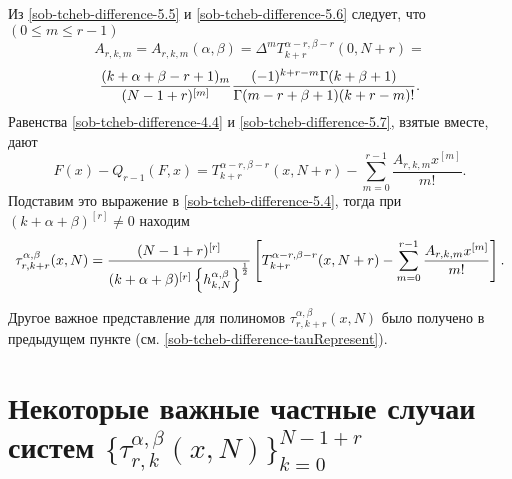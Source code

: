 Из \eqref{sob-tcheb-difference-5.5} и \eqref{sob-tcheb-difference-5.6} следует, что $(0\le m\le r-1)$
$$
A_{r,k,m}=A_{r,k,m}(\alpha,\beta)=\Delta^m T_{k+r}^{\alpha-r,\beta-r}(0,N+r)=
$$
\begin{equation}\label{sob-tcheb-difference-5.7}
{(k+\alpha+\beta-r+1)_m\over
(N-1+r)^{[m]}}\frac{(-1)^{k+r-m}\Gamma(k+\beta+1)}{\Gamma(m-r+\beta+1)(k+r-m)!}.
\end{equation}
 Равенства \eqref{sob-tcheb-difference-4.4}  и  \eqref{sob-tcheb-difference-5.7}, взятые вместе, дают
\begin{equation}\label{sob-tcheb-difference-5.8}
F(x)-Q_{r-1}(F,x)=T_{k+r}^{\alpha-r,\beta-r}(x,N+r)-\sum_{m=0}^{r-1}\frac{A_{r,k,m}x^{[m]}}{m!}.
 \end{equation}
 Подставим это выражение в \eqref{sob-tcheb-difference-5.4}, тогда при $(k+\alpha+\beta)^{[r]}\ne0$ находим
\begin{equation}\label{sob-tcheb-difference-5.9}
\tau_{r,k+r}^{\alpha,\beta}(x,N)=
{(N-1+r)^{[r]}\over(k+\alpha+\beta)^{[r]}\left\{h_{k,N}^{\alpha,\beta}\right\}^{\frac12}}
\left[T_{k+r}^{\alpha-r,\beta-r}(x,N+r)-\sum_{m=0}^{r-1}\frac{A_{r,k,m}x^{[m]}}{m!}\right].
\end{equation}

Другое важное представление для полиномов $\tau_{r,k+r}^{\alpha,\beta}(x,N)$ было получено в предыдущем пункте (см. \eqref{sob-tcheb-difference-tauRepresent}).

\section{Некоторые важные частные случаи систем $\{\tau_{r,k}^{\alpha,\beta}(x,N)\}_{k=0}^{N-1+r} $}

